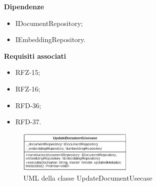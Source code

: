 \textbf{Dipendenze}
\begin{itemize}[itemsep=-4pt]
    \item IDocumentRepository;
    \item IEmbeddingRepository.
\end{itemize}
\textbf{Requisiti associati}
\begin{itemize}[itemsep=-4pt]
    \item RFZ-15;
    \item RFZ-16;
    \item RFD-36;
    \item RFD-37.
\end{itemize}

\begin{figure}[h!]
    \centering  
    \includegraphics[width=0.5\textwidth]{UpdateDocumentUsecase.png}
    \caption{UML della classe UpdateDocumentUsecase}
\end{figure}

